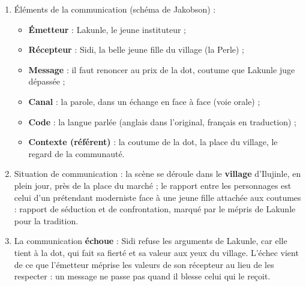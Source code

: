 \documentclass[11pt]{article}
\begin{document}
\begin{corrige}
\begin{enumerate}
\item Éléments de la communication (schéma de Jakobson) :
\begin{itemize}
\item \textbf{Émetteur} : Lakunle, le jeune instituteur ;
\item \textbf{Récepteur} : Sidi, la belle jeune fille du village (la Perle) ;
\item \textbf{Message} : il faut renoncer au prix de la dot, coutume que Lakunle juge dépassée ;
\item \textbf{Canal} : la parole, dans un échange en face à face (voie orale) ;
\item \textbf{Code} : la langue parlée (anglais dans l'original, français en traduction) ;
\item \textbf{Contexte (référent)} : la coutume de la dot, la place du village, le regard de la communauté.
\end{itemize}
\item Situation de communication : la scène se déroule dans le \textbf{village} d'Ilujinle, en plein jour, près de la place du marché ; le rapport entre les personnages est celui d'un prétendant moderniste face à une jeune fille attachée aux coutumes : rapport de séduction et de confrontation, marqué par le mépris de Lakunle pour la tradition.
\item La communication \textbf{échoue} : Sidi refuse les arguments de Lakunle, car elle tient à la dot, qui fait sa fierté et sa valeur aux yeux du village. L'échec vient de ce que l'émetteur méprise les valeurs de son récepteur au lieu de les respecter : un message ne passe pas quand il blesse celui qui le reçoit.
\end{enumerate}
\end{corrige}
\end{document}
